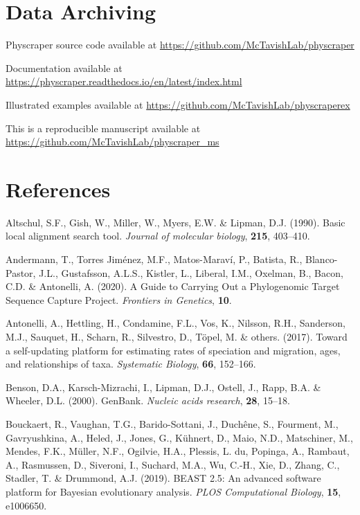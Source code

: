 \documentclass[]{article}
\begin{document}
\hypertarget{data-archiving}{%
\section{Data Archiving}\label{data-archiving}}

Physcraper source code available at \url{https://github.com/McTavishLab/physcraper}

Documentation available at \url{https://physcraper.readthedocs.io/en/latest/index.html}

Illustrated examples available at \url{https://github.com/McTavishLab/physcraperex}

This is a reproducible manuscript available at \url{https://github.com/McTavishLab/physcraper_ms}

\hypertarget{references}{%
\section*{References}\label{references}}

\hypertarget{refs}{}
\leavevmode\hypertarget{ref-altschul1990basic}{}%
Altschul, S.F., Gish, W., Miller, W., Myers, E.W. \& Lipman, D.J. (1990). Basic local alignment search tool. \emph{Journal of molecular biology}, \textbf{215}, 403--410.

\leavevmode\hypertarget{ref-andermann2020guide}{}%
Andermann, T., Torres Jiménez, M.F., Matos-Maraví, P., Batista, R., Blanco-Pastor, J.L., Gustafsson, A.L.S., Kistler, L., Liberal, I.M., Oxelman, B., Bacon, C.D. \& Antonelli, A. (2020). A Guide to Carrying Out a Phylogenomic Target Sequence Capture Project. \emph{Frontiers in Genetics}, \textbf{10}.

\leavevmode\hypertarget{ref-antonelli2017toward}{}%
Antonelli, A., Hettling, H., Condamine, F.L., Vos, K., Nilsson, R.H., Sanderson, M.J., Sauquet, H., Scharn, R., Silvestro, D., Töpel, M. \& others. (2017). Toward a self-updating platform for estimating rates of speciation and migration, ages, and relationships of taxa. \emph{Systematic Biology}, \textbf{66}, 152--166.

\leavevmode\hypertarget{ref-benson2000genbank}{}%
Benson, D.A., Karsch-Mizrachi, I., Lipman, D.J., Ostell, J., Rapp, B.A. \& Wheeler, D.L. (2000). GenBank. \emph{Nucleic acids research}, \textbf{28}, 15--18.

\leavevmode\hypertarget{ref-bouckaert2019beast}{}%
Bouckaert, R., Vaughan, T.G., Barido-Sottani, J., Duchêne, S., Fourment, M., Gavryushkina, A., Heled, J., Jones, G., Kühnert, D., Maio, N.D., Matschiner, M., Mendes, F.K., Müller, N.F., Ogilvie, H.A., Plessis, L. du, Popinga, A., Rambaut, A., Rasmussen, D., Siveroni, I., Suchard, M.A., Wu, C.-H., Xie, D., Zhang, C., Stadler, T. \& Drummond, A.J. (2019). BEAST 2.5: An advanced software platform for Bayesian evolutionary analysis. \emph{PLOS Computational Biology}, \textbf{15}, e1006650.
\end{document}
